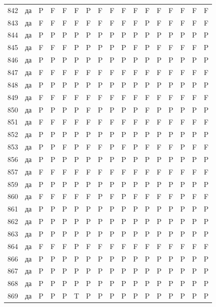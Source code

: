 \begin{table}[p]
\begin{tabular*}{\textwidth}{@{\extracolsep{\fill}}rcccccccccccccccc}
842 & да & P & F & F & F & P & F & F & F & F & F & F & F & F & F & F\\
843 & да & F & F & F & F & F & F & F & F & F & P & F & F & F & F & F\\
844 & да & P & P & P & P & P & P & P & P & P & P & P & P & P & P & P\\
845 & да & F & F & F & P & P & P & P & P & F & P & F & F & F & F & P\\
846 & да & P & P & P & P & P & P & P & P & P & P & P & P & P & P & P\\
847 & да & F & F & F & F & F & F & F & F & F & F & F & F & F & F & F\\
848 & да & P & P & P & P & P & P & P & P & P & P & P & P & P & P & P\\
849 & да & F & F & F & F & F & F & F & F & F & F & F & F & F & F & F\\
850 & да & P & P & P & P & F & P & P & P & P & F & P & P & P & P & P\\
851 & да & F & F & F & F & F & F & F & F & F & F & F & F & F & F & F\\
852 & да & P & P & P & P & P & P & P & P & P & P & P & P & P & P & P\\
853 & да & P & P & F & P & F & F & P & F & P & F & F & F & P & F & F\\
856 & да & P & P & P & P & P & P & P & P & P & P & P & P & P & P & P\\
857 & да & F & F & F & F & F & F & F & F & F & F & F & F & F & F & F\\
859 & да & P & P & P & P & P & P & P & P & P & P & P & P & P & P & P\\
860 & да & F & F & F & F & F & P & F & P & F & F & F & F & P & F & F\\
861 & да & P & P & P & P & P & P & P & P & P & P & P & P & P & P & P\\
862 & да & P & P & P & P & P & P & P & P & P & P & P & P & P & P & P\\
863 & да & P & P & P & P & P & P & P & P & P & P & P & P & P & P & P\\
864 & да & F & F & F & P & F & F & F & F & F & F & F & F & F & F & F\\
866 & да & P & P & P & P & P & P & P & P & P & P & P & P & P & P & P\\
867 & да & P & P & P & P & P & P & P & P & P & P & P & P & P & P & P\\
868 & да & P & P & P & P & P & P & P & P & P & P & P & P & P & P & P\\
869 & да & P & P & P & T & P & P & P & P & P & P & P & P & P & P & P\\
\bottomrule\end{tabular*}\end{table}
\clearpage

